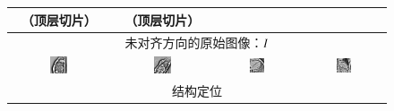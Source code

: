 \renewcommand{\captiontitle}{\CNN{} 分割错误例子}
\begin{figure}
\begin{center}

\setlength{\tabcolsep}{1pt}

\begin{tabular}{cccc}

\toprule
\SA{}（顶层切片） & \SA{}（顶层切片） & \HLA{} & \VLA{} \\
\midrule

\multicolumn{4}{c}{未对齐方向的原始图像：$I$} \\

\includegraphics[width=0.19\textwidth]{./data/failures/HCMNet_2000062/00_SAX/9/9.png} &
\includegraphics[width=0.19\textwidth]{./data/failures/HCMNet_2400044/00_SAX/2/5.png} &
\includegraphics[width=0.19\textwidth]{./data/failures/HCMNet_2600079/01_HLA/00/0.png} &
\includegraphics[width=0.19\textwidth]{./data/failures/HCMNet_2600079/02_VLA/00/0.png} \\

\multicolumn{4}{c}{结构定位} \\


\end{tabular}
\end{center}
\end{figure}
